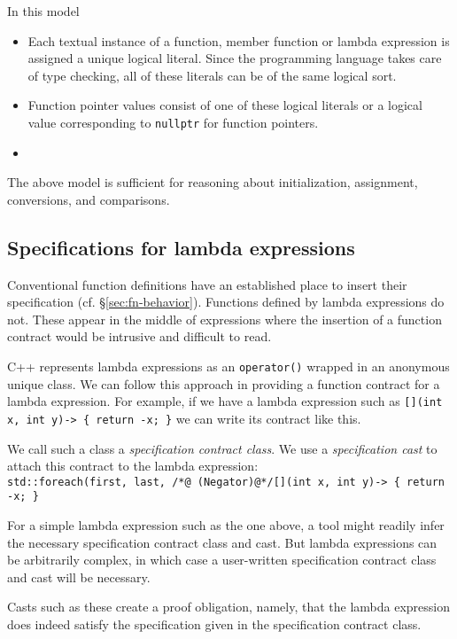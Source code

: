  In this model
 \begin{itemize}
 	\item Each textual instance of a function, member function or lambda expression is assigned a unique logical literal.
 	Since the programming language takes care of type checking,
 	all of these literals can be of the same logical sort.
 	\item Function pointer values consist of one of these logical literals or a logical value corresponding to 
 	\lstinline|nullptr| for function pointers.
 	\item {}
 \end{itemize}
The above model is sufficient for reasoning about initialization, assignment, conversions, and comparisons.

\subsection{Specifications for lambda expressions}
\label{sec:lambdaspecs}

Conventional function definitions have an established place to insert their specification (cf. \S\ref{sec:fn-behavior}). Functions defined by lambda expressions do not. These appear in the middle of expressions where the insertion of a function contract would be intrusive and difficult to read.

C++ represents lambda expressions as an \lstinline|operator()| wrapped in an anonymous unique class. We can follow this 
approach in providing a function contract for a lambda expression.  
For example, if we have a lambda expression such as \lstinline|[](int x, int y)-> { return -x; }| we can write its contract like this.



We call such a class a \emph{specification contract class}.
We use a \emph{specification cast} to attach this contract to
the lambda expression:\\
\lstinline|std::foreach(first, last, /*@ (Negator)@*/[](int x, int y)-> { return -x; }|

For a simple lambda expression such as the one above, a tool might readily infer the necessary specification contract class and cast. But lambda expressions can be arbitrarily complex, in which case a user-written specification contract class and cast will be necessary.

Casts such as these create a proof obligation, namely, that the 
lambda expression does indeed satisfy the specification given in the
specification contract class.

